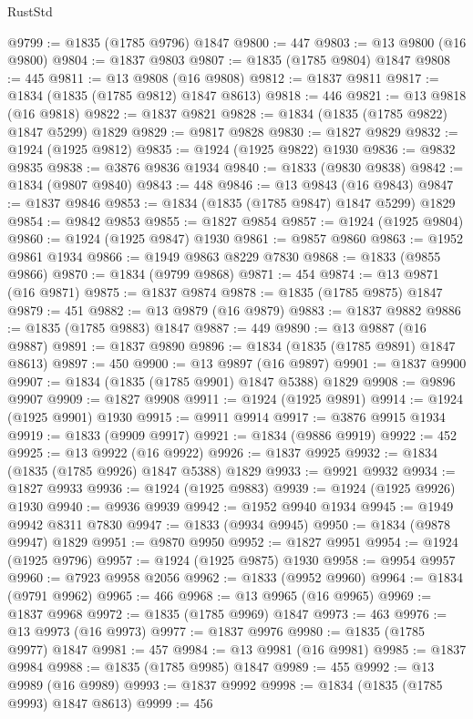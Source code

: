\begin{lexlean}{RustStd}
\begin{coremodule}
@9799 := @1835 (@1785 @9796) @1847
@9800 := 447
@9803 := @13 @9800 (@16 @9800)
@9804 := @1837 @9803
@9807 := @1835 (@1785 @9804) @1847
@9808 := 445
@9811 := @13 @9808 (@16 @9808)
@9812 := @1837 @9811
@9817 := @1834 (@1835 (@1785 @9812) @1847 @8613)
@9818 := 446
@9821 := @13 @9818 (@16 @9818)
@9822 := @1837 @9821
@9828 := @1834 (@1835 (@1785 @9822) @1847 @5299) @1829
@9829 := @9817 @9828
@9830 := @1827 @9829
@9832 := @1924 (@1925 @9812)
@9835 := @1924 (@1925 @9822) @1930
@9836 := @9832 @9835
@9838 := @3876 @9836 @1934
@9840 := @1833 (@9830 @9838)
@9842 := @1834 (@9807 @9840)
@9843 := 448
@9846 := @13 @9843 (@16 @9843)
@9847 := @1837 @9846
@9853 := @1834 (@1835 (@1785 @9847) @1847 @5299) @1829
@9854 := @9842 @9853
@9855 := @1827 @9854
@9857 := @1924 (@1925 @9804)
@9860 := @1924 (@1925 @9847) @1930
@9861 := @9857 @9860
@9863 := @1952 @9861 @1934
@9866 := @1949 @9863 @8229 @7830
@9868 := @1833 (@9855 @9866)
@9870 := @1834 (@9799 @9868)
@9871 := 454
@9874 := @13 @9871 (@16 @9871)
@9875 := @1837 @9874
@9878 := @1835 (@1785 @9875) @1847
@9879 := 451
@9882 := @13 @9879 (@16 @9879)
@9883 := @1837 @9882
@9886 := @1835 (@1785 @9883) @1847
@9887 := 449
@9890 := @13 @9887 (@16 @9887)
@9891 := @1837 @9890
@9896 := @1834 (@1835 (@1785 @9891) @1847 @8613)
@9897 := 450
@9900 := @13 @9897 (@16 @9897)
@9901 := @1837 @9900
@9907 := @1834 (@1835 (@1785 @9901) @1847 @5388) @1829
@9908 := @9896 @9907
@9909 := @1827 @9908
@9911 := @1924 (@1925 @9891)
@9914 := @1924 (@1925 @9901) @1930
@9915 := @9911 @9914
@9917 := @3876 @9915 @1934
@9919 := @1833 (@9909 @9917)
@9921 := @1834 (@9886 @9919)
@9922 := 452
@9925 := @13 @9922 (@16 @9922)
@9926 := @1837 @9925
@9932 := @1834 (@1835 (@1785 @9926) @1847 @5388) @1829
@9933 := @9921 @9932
@9934 := @1827 @9933
@9936 := @1924 (@1925 @9883)
@9939 := @1924 (@1925 @9926) @1930
@9940 := @9936 @9939
@9942 := @1952 @9940 @1934
@9945 := @1949 @9942 @8311 @7830
@9947 := @1833 (@9934 @9945)
@9950 := @1834 (@9878 @9947) @1829
@9951 := @9870 @9950
@9952 := @1827 @9951
@9954 := @1924 (@1925 @9796)
@9957 := @1924 (@1925 @9875) @1930
@9958 := @9954 @9957
@9960 := @7923 @9958 @2056
@9962 := @1833 (@9952 @9960)
@9964 := @1834 (@9791 @9962)
@9965 := 466
@9968 := @13 @9965 (@16 @9965)
@9969 := @1837 @9968
@9972 := @1835 (@1785 @9969) @1847
@9973 := 463
@9976 := @13 @9973 (@16 @9973)
@9977 := @1837 @9976
@9980 := @1835 (@1785 @9977) @1847
@9981 := 457
@9984 := @13 @9981 (@16 @9981)
@9985 := @1837 @9984
@9988 := @1835 (@1785 @9985) @1847
@9989 := 455
@9992 := @13 @9989 (@16 @9989)
@9993 := @1837 @9992
@9998 := @1834 (@1835 (@1785 @9993) @1847 @8613)
@9999 := 456

\end{coremodule}
\end{lexlean}
